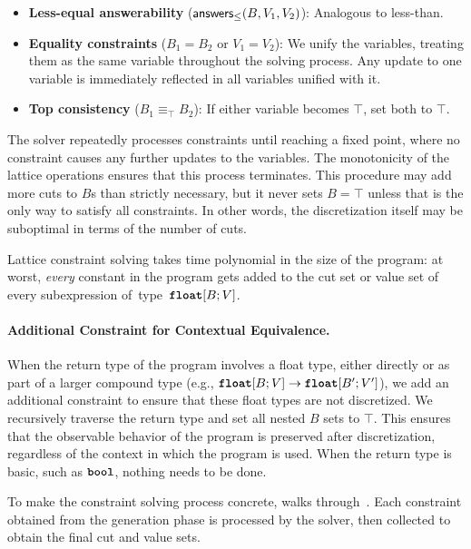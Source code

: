 \begin{itemize}[leftmargin=*]
    \item \textbf{Less-equal answerability} ($\mathsf{answers}_{\leq}(B, V_1, V_2)$): Analogous to less-than. 

	    \item \textbf{Equality constraints} ($B_1 = B_2$ or $V_1 = V_2$): We unify the variables, treating them as the same variable throughout the solving process. Any update to one variable is immediately reflected in all variables unified with it. 

	    \item \textbf{Top consistency} ($B_1 \equiv_{\top} B_2$): If either variable becomes $\top$, set both to $\top$. 
\end{itemize}

The solver repeatedly processes constraints until reaching a fixed point, where no constraint causes any further updates to the variables. The monotonicity of the lattice operations ensures that this process terminates. This procedure may add more cuts to $B$s than strictly necessary, but it never sets $B=\top$ unless that is the only way to satisfy all constraints. In other words, the discretization itself may be suboptimal in terms of the number of cuts.

Lattice constraint solving takes time polynomial in the size of the program: at worst, \emph{every} constant in the program gets added to the cut set or value set of every subexpression \mbox{of type $\textnormal{\ttfamily\bfseries float}[B;V]$.}

\paragraph{Additional Constraint for Contextual Equivalence.}
When the return type of the program involves a float type, either directly or as part of a larger compound type (e.g., $\textnormal{\ttfamily\bfseries float}[B;V] \to \textnormal{\ttfamily\bfseries float}[B';V']$), we add an additional constraint to ensure that these float types are not discretized. %
We recursively traverse the return type and set all nested $B$ sets to $\top$. This ensures that the observable behavior of the program is preserved after discretization, regardless of the context in which the program is used. When the return type is basic, such as $\textnormal{\ttfamily\bfseries bool}$, nothing needs to be done.

\begin{example}
  To make the constraint solving process concrete,  walks through~. Each constraint obtained from the generation phase is processed by the solver, then collected to obtain the final cut and value sets.
\end{example}
